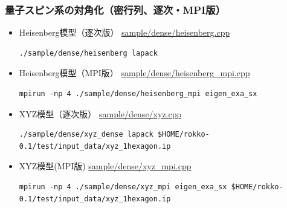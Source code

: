 \begin{frame}[c,fragile]
  \frametitle{量子スピン系の対角化（密行列、逐次・MPI版）}
  \begin{itemize}
  \item Heisenberg模型（逐次版） \href{https://github.com/t-sakashita/rokko/blob/master/sample/dense/heisenberg_mpi.cpp}{sample/dense/heisenberg.cpp}
\begin{lstlisting}[style=shstyle]
./sample/dense/heisenberg lapack
\end{lstlisting}
  \item Heisenberg模型（MPI版） \href{https://github.com/t-sakashita/rokko/blob/master/sample/dense/heisenberg_mpi.cpp}{sample/dense/heisenberg\_mpi.cpp}
\begin{lstlisting}[style=shstyle]
mpirun -np 4 ./sample/dense/heisenberg_mpi eigen_exa_sx
\end{lstlisting}
  \item XYZ模型（逐次版） \href{https://github.com/t-sakashita/rokko/blob/develop/sample/dense/xyz_dense.cpp}{sample/dense/xyz.cpp}
\begin{lstlisting}[style=shstyle]
./sample/dense/xyz_dense lapack $HOME/rokko-0.1/test/input_data/xyz_1hexagon.ip
\end{lstlisting}
  \item XYZ模型(MPI版) \href{https://github.com/t-sakashita/rokko/blob/develop/sample/dense/xyz_mpi.cpp}{sample/dense/xyz\_mpi.cpp}
\begin{lstlisting}
mpirun -np 4 ./sample/dense/xyz_mpi eigen_exa_sx $HOME/rokko-0.1/test/input_data/xyz_1hexagon.ip
\end{lstlisting}
  \end{itemize}
\end{frame}

